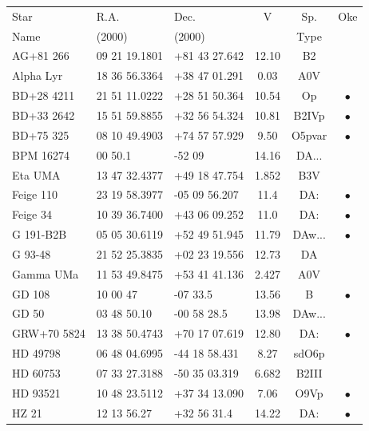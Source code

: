 \begin{table}[htbp]

\begin{center}
\begin{tabular}{lllccc}
Star        &      R.A.     &      Dec.     &     V   &  Sp.   & Oke \\
Name        &    (2000)     &    (2000)     &         & Type   & \\ \hline
AG+81 266   & 09 21 19.1801 & +81 43 27.642 &  12.10  & B2     &   \\
Alpha Lyr   & 18 36 56.3364 & +38 47 01.291 &   0.03  & A0V    &   \\
BD+28 4211  & 21 51 11.0222 & +28 51 50.364 &  10.54  & Op     & $\bullet$ \\
BD+33 2642  & 15 51 59.8855 & +32 56 54.324 &  10.81  & B2IVp  & $\bullet$ \\
BD+75 325   & 08 10 49.4903 & +74 57 57.929 &   9.50  & O5pvar & $\bullet$ \\
BPM 16274   & 00 50.1       & -52 09        &  14.16  & DA...  &   \\
Eta UMA     & 13 47 32.4377 & +49 18 47.754 &   1.852 & B3V    &   \\
Feige 110   & 23 19 58.3977 & -05 09 56.207 &  11.4   & DA:    & $\bullet$ \\
Feige 34    & 10 39 36.7400 & +43 06 09.252 &  11.0   & DA:    & $\bullet$ \\ 
G 191-B2B   & 05 05 30.6119 & +52 49 51.945 &  11.79  & DAw... & $\bullet$ \\
G 93-48     & 21 52 25.3835 & +02 23 19.556 &  12.73  & DA     &   \\
Gamma UMa   & 11 53 49.8475 & +53 41 41.136 &   2.427 & A0V    &   \\
GD 108      & 10 00 47      & -07 33.5      &  13.56  & B      & $\bullet$ \\
GD 50       & 03 48 50.10   & -00 58 28.5   &  13.98  & DAw... &   \\
GRW+70 5824 & 13 38 50.4743 & +70 17 07.619 &  12.80  & DA:    & $\bullet$ \\
HD 49798    & 06 48 04.6995 & -44 18 58.431 &   8.27  & sdO6p  &   \\
HD 60753    & 07 33 27.3188 & -50 35 03.319 &   6.682 & B2III  &   \\
HD 93521    & 10 48 23.5112 & +37 34 13.090 &   7.06  & O9Vp   & $\bullet$ \\
HZ 21       & 12 13 56.27   & +32 56 31.4   &  14.22  & DA:    & $\bullet$ \\

\end{tabular}
\end{center}
\end{table}
